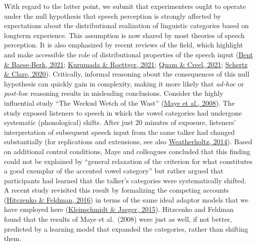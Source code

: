 \documentclass[
  11pt,
  man,floatsintext]{apa6}
\begin{document}
With regard to the latter point, we submit that experimenters ought to operate under the null hypothesis that speech perception is strongly affected by expectations about the distributional realization of linguistic categories based on longterm experience. This assumption is now shared by most theories of speech perception. It is also emphasized by recent reviews of the field, which highlight and make accessible the role of distributional properties of the speech input (\protect\hyperlink{ref-bent-baeseberk2021}{Bent \& Baese-Berk, 2021}; \protect\hyperlink{ref-kurumada-roettger2021}{Kurumada \& Roettger, 2021}; \protect\hyperlink{ref-quam-creel2021}{Quam \& Creel, 2021}; \protect\hyperlink{ref-schertz-clare2020}{Schertz \& Clare, 2020}). Critically, informal reasoning about the consequences of this null hypothesis can quickly gain in complexity, making it more likely that \emph{ad-hoc} or \emph{post-hoc} reasoning results in misleading conclusions. Consider the highly influential study ``The Weckud Wetch of the Wast'' (\protect\hyperlink{ref-maye2008}{Maye et al., 2008}). The study exposed listeners to speech in which the vowel categories had undergone systematic (phonological) shifts. After just 20 minutes of exposure, listeners' interpretation of subsequent speech input from the same talker had changed substantially (for replications and extensions, see also \protect\hyperlink{ref-weatherholtz2014}{Weatherholtz, 2014}). Based on additional control conditions, Maye and colleagues concluded that this finding could not be explained by ``general relaxation of the criterion for what constitutes a good exemplar of the accented vowel category'' but rather argued that participants had learned that the talker's categories were systematically shifted. A recent study revisited this result by formalizing the competing accounts (\protect\hyperlink{ref-hitczenko-feldman2016}{Hitczenko \& Feldman, 2016}) in terms of the same ideal adaptor models that we have employed here (\protect\hyperlink{ref-kleinschmidt-jaeger2015}{Kleinschmidt \& Jaeger, 2015}). Hitzcenko and Feldman found that the results of Maye et al.~(2008) were just as well, if not better, predicted by a learning model that expanded the categories, rather than shifting them.
\end{document}
